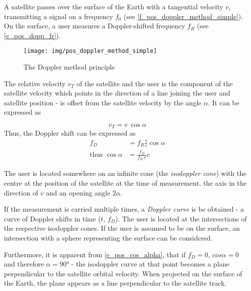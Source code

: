 A satellite passes over the surface of the Earth with a tangential velocity $v$, transmitting a signal on a frequency $f_0$ (see \autoref{f_pos_doppler_method_simple}). On the surface, a user measures a Doppler-shifted frequency $f_R$ (see \autoref{e_pos_dopp_fr}).

\begin{figure}
    \centering
    \texttt{[image: img/pos\_doppler\_method\_simple]}
    \caption{The Doppler method principle}
    \label{f_pos_doppler_method_simple}
\end{figure}

The relative velocity $v_T$ of the satellite and the user is the component of the satellite velocity which points in the direction of a line joining the user and satellite position - is offset from the satellite velocity by the angle $\alpha$. It can be expressed as

\begin{equation*}
    v_T = v \ \cos{\alpha}
\end{equation*}
Thus, the Doppler shift can be expressed as
\begin{align}
    \label{e_pos_fd_alpha}
    f_D &= f_R \frac{v}{c} \cos{\alpha} \\
    \label{e_pos_cos_alpha}
    \text{thus } \cos{\alpha} &= \frac{f_D}{f_R \ v}c
\end{align}

The user is located somewhere on an infinite cone (the \textit{isodoppler cone}) with the centre at the position of the satellite at the time of measurement, the axis in the direction of $v$ and an opening angle $2\alpha$.

If the measurement is carried multiple times, a \textit{Doppler curve} is be obtained - a curve of Doppler shifts in time ($t$, $f_D$). The user is located at the intersections of the respective isodoppler cones. If the user is assumed to be on the surface, an intersection with a sphere representing the surface can be considered.

Furthermore, it is apparent from \autoref{e_pos_cos_alpha}, that if $f_D = 0$, $cos \alpha = 0$ and therefore $\alpha = \ang{90}$ - the isodoppler curve at that point becomes a plane perpendicular to the satellite orbital velocity. When projected on the surface of the Earth, the plane appears as a line perpendicular to the satellite track.

